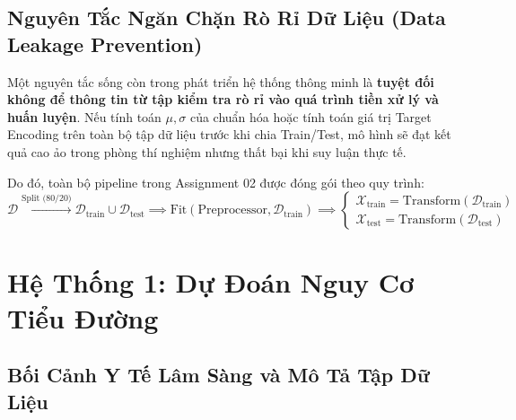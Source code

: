 \documentclass[12pt,a4paper]{report}
\begin{document}
\section{Nguyên Tắc Ngăn Chặn Rò Rỉ Dữ Liệu (Data Leakage Prevention)}
Một nguyên tắc sống còn trong phát triển hệ thống thông minh là \textbf{tuyệt đối không để thông tin từ tập kiểm tra rò rỉ vào quá trình tiền xử lý và huấn luyện}. 
Nếu tính toán $\mu, \sigma$ của chuẩn hóa hoặc tính toán giá trị Target Encoding trên toàn bộ tập dữ liệu trước khi chia Train/Test, mô hình sẽ đạt kết quả cao ảo trong phòng thí nghiệm nhưng thất bại khi suy luận thực tế.

Do đó, toàn bộ pipeline trong Assignment 02 được đóng gói theo quy trình:
\begin{equation}
\mathcal{D} \xrightarrow{\text{Split (80/20)}} \mathcal{D}_{\text{train}} \cup \mathcal{D}_{\text{test}} \implies \text{Fit}(\text{Preprocessor}, \mathcal{D}_{\text{train}}) \implies \begin{cases} \mathcal{X}_{\text{train}} = \text{Transform}(\mathcal{D}_{\text{train}}) \\ \mathcal{X}_{\text{test}} = \text{Transform}(\mathcal{D}_{\text{test}}) \end{cases}
\end{equation}

\chapter{Hệ Thống 1: Dự Đoán Nguy Cơ Tiểu Đường}

\section{Bối Cảnh Y Tế Lâm Sàng và Mô Tả Tập Dữ Liệu}
\end{document}

